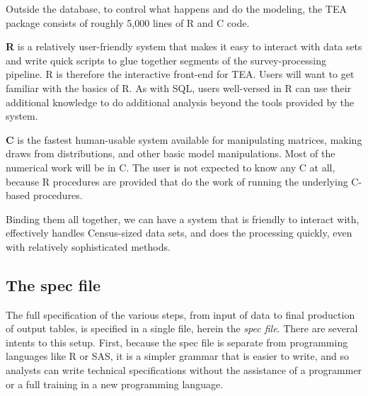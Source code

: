 \documentclass{article}
\begin{document}
Outside the database, to control what happens and
do the modeling, the TEA package consists of roughly 5,000 lines of R and C code.
\comment{

}

{\bf R} is a relatively user-friendly system that makes it easy to interact with data
sets and write quick scripts to glue together segments of the survey-processing pipeline.
R is therefore the interactive front-end for TEA. Users will want to get familiar with the basics of
R.  As with SQL, users well-versed in R can use their additional knowledge to do additional
analysis beyond the tools provided by the system.

{\bf C} is the fastest human-usable system available for manipulating matrices, making
draws from distributions, and other basic model manipulations. Most of the numerical
work will be in C. The user is not expected to know any C at all, because R procedures
are provided that do the work of running the underlying C-based procedures.

Binding them all together, we can have a system that is friendly to interact with, effectively handles Census-sized data sets, and does the processing quickly, even with relatively sophisticated methods.


\subsection{The spec file} \label{specsec}
The full specification of the various steps, from input of data to final production of
output tables, is specified in a single file, herein the {\em spec file}. There are
several intents to this setup. First, because the spec file is separate from programming
languages like R or SAS, it is a simpler grammar that is easier to write, and so 
analysts can write technical specifications without the assistance of a programmer or
a full training in a new programming language.
\end{document}
